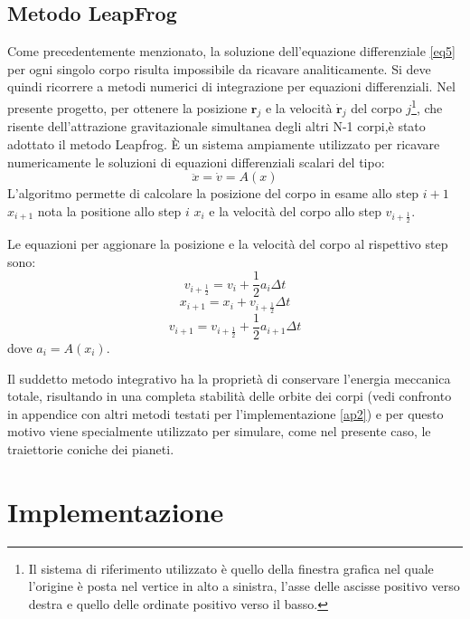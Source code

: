\documentclass{article}
\begin{document}
\subsection{Metodo LeapFrog}
Come precedentemente menzionato, la soluzione dell'equazione differenziale \ref{eq5} per ogni singolo corpo risulta impossibile da ricavare analiticamente. Si deve quindi ricorrere a metodi numerici di integrazione per equazioni differenziali.
Nel presente progetto,  per ottenere la posizione $\mathbf{r}_{j}$ e la velocità $\mathbf{\dot{r}}_{j}$ del corpo $j$\footnote{Il sistema di riferimento utilizzato è quello della finestra grafica nel quale  l'origine è posta nel vertice in alto a sinistra, l'asse delle ascisse positivo verso destra e quello delle ordinate positivo verso il basso.}, che risente dell'attrazione gravitazionale simultanea degli altri N-1 corpi,è stato adottato il metodo Leapfrog.
È un sistema ampiamente utilizzato per ricavare numericamente le soluzioni di equazioni differenziali scalari del tipo:
\begin{equation}
    \ddot{x}=\dot{v}=A(x)
\end{equation}
L'algoritmo permette di calcolare la posizione del corpo in esame allo step $i+1$ $x_{i+1}$ nota la positione allo step $i$ $x_{i}$ e la velocità del corpo allo step $v_{i+\frac{1}{2}}$.

Le equazioni per aggionare la posizione e la velocità del corpo al rispettivo step sono:
\begin{equation}
    v_{i+\frac{1}{2}}=v_{i}+\frac{1}{2}a_{i}\Delta t
\end{equation}
\begin{equation}
    x_{i+1}=x_{i}+v_{i+\frac{1}{2}}\Delta t
\end{equation}
\begin{equation}
    v_{i+1}=v_{i+\frac{1}{2}}+ \frac{1}{2}a_{i+1}\Delta t
\end{equation}
dove $a_{i}=A(x_{i})$.

Il suddetto metodo integrativo ha la proprietà di conservare l'energia meccanica totale, risultando in una completa stabilità delle orbite dei corpi (vedi confronto in appendice con altri metodi testati per l'implementazione \ref{ap2}) e per questo motivo viene specialmente utilizzato per simulare, come nel presente caso, le traiettorie coniche dei pianeti.

\section{Implementazione}
\end{document}

